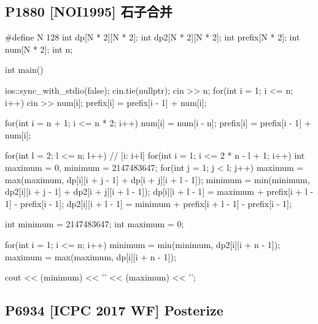 \subsection{P1880 {[}NOI1995{]} 石子合并}\label{p1880-noi1995-ux77f3ux5b50ux5408ux5e76}






\begin{codeline}
#define N 128
int dp[N * 2][N * 2];
int dp2[N * 2][N * 2];
int prefix[N * 2];
int num[N * 2];
int n;

int main() {
    ios::sync_with_stdio(false);
    cin.tie(nullptr);
    cin >> n;
    for(int i = 1; i <= n; i++) {
        cin >> num[i];
        prefix[i] = prefix[i - 1] + num[i];
    }

    for(int i = n + 1; i <= n * 2; i++) {
        num[i] = num[i - n];
        prefix[i] = prefix[i - 1] + num[i];
    }

    for(int l = 2; l <= n; l++) { // [i: i+l]
        for(int i = 1; i <= 2 * n - l + 1; i++) {
            int maximum = 0, minimum = 2147483647;
            for(int j = 1; j < l; j++) {
                maximum = max(maximum, dp[i][i + j - 1] + dp[i + j][i + l - 1]);
                minimum = min(minimum, dp2[i][i + j - 1] + dp2[i + j][i + l - 1]);
            }
            dp[i][i + l - 1] = maximum + prefix[i + l - 1] - prefix[i - 1];
            dp2[i][i + l - 1] = minimum + prefix[i + l - 1] - prefix[i - 1];
        }
    }

    int minimum = 2147483647;
    int maximum = 0;

    for(int i = 1; i <= n; i++) {
        minimum = min(minimum, dp2[i][i + n - 1]);
        maximum = max(maximum, dp[i][i + n - 1]);
    }

    cout << (minimum) << '\n'
         << (maximum) << '\n';
}
\end{codeline}


\subsection{P6934 {[}ICPC 2017 WF{]} Posterize}\label{p6934-icpc-2017-wf-posterize}






